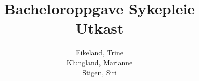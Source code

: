 \documentclass[a4paper,norsk,12pt]{report}
\begin{document}
  \author{
    Eikeland, Trine\\
    Klungland, Marianne\\
    Stigen, Siri\\
  }
  \title{Bacheloroppgave Sykepleie\\ \Huge{Utkast}}

  \maketitle

  \tableofcontents

  \clearpage

  
  \clearpage

  \begingroup %
  \raggedright %
  \nocite{*} %
  
  \endgroup %
\end{document}
